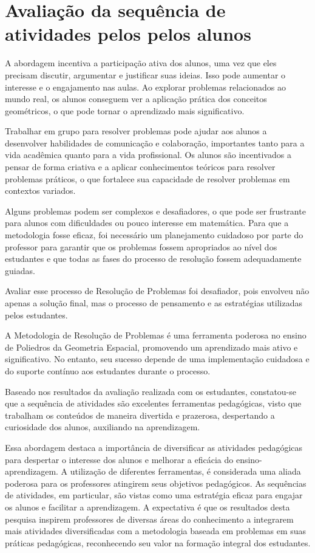 \section{Avaliação da sequência de atividades pelos pelos alunos}

A abordagem incentiva a participação ativa dos alunos, uma vez que eles precisam discutir, argumentar e justificar suas ideias. Isso pode aumentar o interesse e o engajamento nas aulas. Ao explorar problemas relacionados ao mundo real, os alunos conseguem ver a aplicação prática dos conceitos geométricos, o que pode tornar o aprendizado mais significativo.

Trabalhar em grupo para resolver problemas pode ajudar aos alunos a desenvolver habilidades de comunicação e colaboração, importantes tanto para a vida acadêmica quanto para a vida profissional. Os alunos são incentivados a pensar de forma criativa e a aplicar conhecimentos teóricos para resolver problemas práticos, o que fortalece sua capacidade de resolver problemas em contextos variados.

Alguns problemas podem ser complexos e desafiadores, o que pode ser frustrante para alunos com dificuldades ou pouco interesse em matemática. Para que a metodologia fosse eficaz, foi necessário um planejamento cuidadoso por parte do professor para garantir que os problemas fossem apropriados ao nível dos estudantes e que todas as fases do processo de resolução fossem adequadamente guiadas.

Avaliar esse processo de Resolução de Problemas foi desafiador, pois envolveu não apenas a solução final, mas o processo de pensamento e as estratégias utilizadas pelos estudantes.

A Metodologia de Resolução de Problemas é uma ferramenta poderosa no ensino de Poliedros da Geometria Espacial, promovendo um aprendizado mais ativo e significativo. No entanto, seu sucesso depende de uma implementação cuidadosa e do suporte contínuo aos estudantes durante o processo.

Baseado nos resultados da avaliação realizada com os estudantes, constatou-se que a sequência de atividades são excelentes ferramentas pedagógicas, visto que trabalham os conteúdos de maneira divertida e prazerosa, despertando a curiosidade dos alunos, auxiliando na aprendizagem.

Essa abordagem destaca a importância de diversificar as atividades pedagógicas para despertar o interesse dos alunos e melhorar a eficácia do ensino-aprendizagem. A utilização de diferentes ferramentas, é considerada uma aliada poderosa para os professores atingirem seus objetivos pedagógicos. As sequências de atividades, em particular, são vistas como uma estratégia eficaz para engajar os alunos e facilitar a aprendizagem. A expectativa é que os resultados desta pesquisa inspirem professores de diversas áreas do conhecimento a integrarem mais atividades diversificadas com a metodologia baseada em problemas em suas práticas pedagógicas, reconhecendo seu valor na formação integral dos estudantes.

